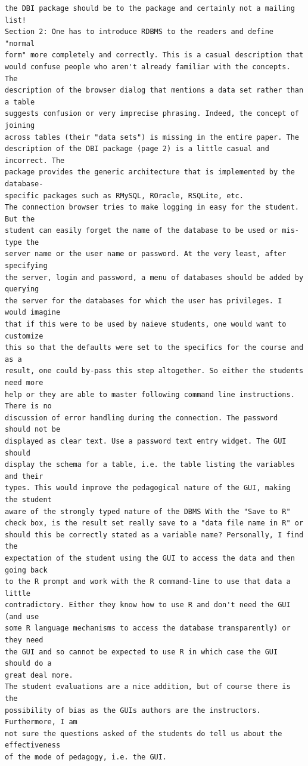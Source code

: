 \documentclass[11pt]{tise_style}
\begin{document}
\begin{verbatim}
the DBI package should be to the package and certainly not a mailing list!
Section 2: One has to introduce RDBMS to the readers and define "normal
form" more completely and correctly. This is a casual description that
would confuse people who aren't already familiar with the concepts. The
description of the browser dialog that mentions a data set rather than a table
suggests confusion or very imprecise phrasing. Indeed, the concept of joining
across tables (their "data sets") is missing in the entire paper. The
description of the DBI package (page 2) is a little casual and incorrect. The
package provides the generic architecture that is implemented by the database-
specific packages such as RMySQL, ROracle, RSQLite, etc.
The connection browser tries to make logging in easy for the student. But the
student can easily forget the name of the database to be used or mis-type the
server name or the user name or password. At the very least, after specifying
the server, login and password, a menu of databases should be added by querying
the server for the databases for which the user has privileges. I would imagine
that if this were to be used by naieve students, one would want to customize
this so that the defaults were set to the specifics for the course and as a
result, one could by-pass this step altogether. So either the students need more
help or they are able to master following command line instructions. There is no
discussion of error handling during the connection. The password should not be
displayed as clear text. Use a password text entry widget. The GUI should
display the schema for a table, i.e. the table listing the variables and their
types. This would improve the pedagogical nature of the GUI, making the student
aware of the strongly typed nature of the DBMS With the "Save to R"
check box, is the result set really save to a "data file name in R" or
should this be correctly stated as a variable name? Personally, I find the
expectation of the student using the GUI to access the data and then going back
to the R prompt and work with the R command-line to use that data a little
contradictory. Either they know how to use R and don't need the GUI (and use
some R language mechanisms to access the database transparently) or they need
the GUI and so cannot be expected to use R in which case the GUI should do a
great deal more.
The student evaluations are a nice addition, but of course there is the
possibility of bias as the GUIs authors are the instructors. Furthermore, I am
not sure the questions asked of the students do tell us about the effectiveness
of the mode of pedagogy, i.e. the GUI.
\end{verbatim}
\end{document}

